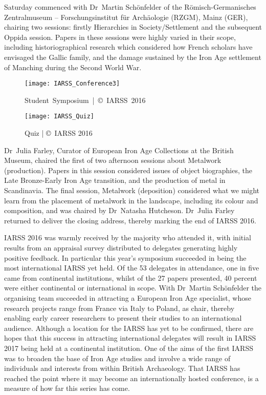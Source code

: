 Saturday commenced with Dr~Martin Schönfelder of the \foreignlanguage{ngerman}{Römisch\--German\-isches Zentralmuseum --
 Forschungsinstitut für Archäologie} (RZGM), Mainz (GER), chairing two sessions: firstly Hierarchies in
  Society/Settlement and the subsequent Oppida session. Papers in these sessions were highly varied in
   their scope, including historiographical research which considered how French scholars have envisaged
    the Gallic family, and the damage sustained by the Iron Age settlement of Manching during the Second World War. 
\begin{wrapfigure}{O}[.05\textwidth]{0.6\linewidth}
\texttt{[image: IARSS\_Conference3]}
\caption{\mbox{Student Symposium |  \copyright\ IARSS 2016}}
\label{fig:IARSS_Conference3}
\vspace{\baselineskip}
\texttt{[image: IARSS\_Quiz]}
\caption{Quiz | \copyright\ IARSS 2016}
\label{fig:IARSS_Quiz}
\end{wrapfigure} 
Dr~Julia Farley, Curator of European Iron Age Collections at the British Museum, chaired the first of two afternoon sessions about Metalwork (production).  Papers in this session considered issues of object biographies, the Late Bronze-Early Iron Age transition, and the production of metal in Scandinavia. 
The final session, Metalwork (deposition) considered what we might learn from the placement of metalwork in the landscape, including its colour and composition, and was chaired by Dr~Natasha Hutcheson. 
Dr~Julia Farley returned to deliver the closing address, thereby marking the end of IARSS 2016.


IARSS 2016 was warmly received by the majority who attended it, with initial results from an appraisal survey distributed to delegates generating highly positive feedback. In particular this year’s symposium succeeded in being the most international IARSS yet held. 
Of the 53 delegates in attendance, one in five came from continental institutions, whilst of the 27 papers presented, 40 percent were either continental or international in scope. With Dr~Martin Schönfelder the organising team succeeded in attracting a European Iron Age specialist, whose research projects range from France via Italy to Poland, as chair, thereby enabling early career researchers to present their studies to an international audience. Although a location for the  IARSS has yet to be confirmed, there are hopes that this success in attracting international delegates will result in IARSS 2017 being held at a continental institution. One of the aims of the first IARSS was to broaden the base of Iron Age studies and involve a wide range of individuals and interests from within British Archaeology. 
That IARSS has reached the point where it may become an internationally hosted conference, is a measure of how far this series has come.
\enlargethispage{\baselineskip}

